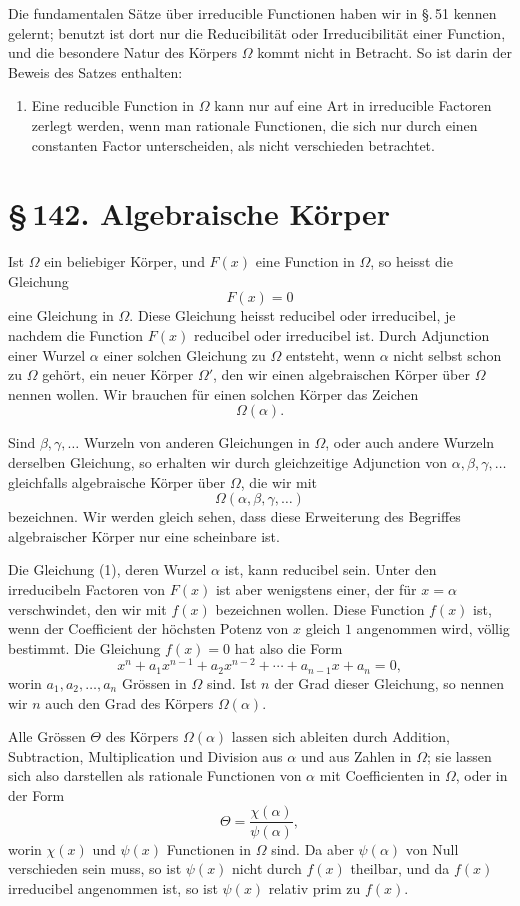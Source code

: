 \documentclass[11pt]{article}
\providecommand{\sect}[2]{\section*{\S\,#1. #2}}
\begin{document}
Die fundamentalen Sätze über irreducible Functionen haben wir in §.\,51 kennen gelernt; benutzt ist dort nur die Reducibilität oder Irreducibilität einer Function, und die besondere Natur des Körpers $\Omega$ kommt nicht in Betracht. So ist darin der Beweis des Satzes enthalten:

\begin{enumerate}[label=\Roman*.,leftmargin=2.8em,start=4]
\item Eine reducible Function in $\Omega$ kann nur auf eine Art in irreducible Factoren zerlegt werden, wenn man rationale Functionen, die sich nur durch einen constanten Factor unterscheiden, als nicht verschieden betrachtet.
\end{enumerate}

\sect{142}{Algebraische Körper}

Ist $\Omega$ ein beliebiger Körper, und $F(x)$ eine Function in $\Omega$, so heisst die Gleichung
\[
\tag{1}
        F(x)=0
\]
eine Gleichung in $\Omega$. Diese Gleichung heisst reducibel oder irreducibel, je nachdem die Function $F(x)$ reducibel oder irreducibel ist. Durch Adjunction einer Wurzel $\alpha$ einer solchen Gleichung zu $\Omega$ entsteht, wenn $\alpha$ nicht selbst schon zu $\Omega$ gehört, ein neuer Körper $\Omega'$, den wir einen algebraischen Körper über $\Omega$ nennen wollen. Wir brauchen für einen solchen Körper das Zeichen
\[
        \Omega(\alpha).
\]

Sind $\beta,\gamma,\ldots$ Wurzeln von anderen Gleichungen in $\Omega$, oder auch andere Wurzeln derselben Gleichung, so erhalten wir durch gleichzeitige Adjunction von $\alpha,\beta,\gamma,\ldots$ gleichfalls algebraische Körper über $\Omega$, die wir mit
\[
        \Omega(\alpha,\beta,\gamma,\ldots)
\]
bezeichnen. Wir werden gleich sehen, dass diese Erweiterung des Begriffes algebraischer Körper nur eine scheinbare ist.

Die Gleichung (1), deren Wurzel $\alpha$ ist, kann reducibel sein. Unter den irreducibeln Factoren von $F(x)$ ist aber wenigstens einer, der für $x=\alpha$ verschwindet, den wir mit $f(x)$ bezeichnen wollen. Diese Function $f(x)$ ist, wenn der Coefficient der höchsten Potenz von $x$ gleich $1$ angenommen wird, völlig bestimmt. Die Gleichung $f(x)=0$ hat also die Form
\[
\tag{2}
        x^n+a_1x^{n-1}+a_2x^{n-2}+\cdots+a_{n-1}x+a_n=0,
\]
worin $a_1,a_2,\ldots,a_n$ Grössen in $\Omega$ sind. Ist $n$ der Grad dieser Gleichung, so nennen wir $n$ auch den Grad des Körpers $\Omega(\alpha)$.

Alle Grössen $\Theta$ des Körpers $\Omega(\alpha)$ lassen sich ableiten durch Addition, Subtraction, Multiplication und Division aus $\alpha$ und aus Zahlen in $\Omega$; sie lassen sich also darstellen als rationale Functionen von $\alpha$ mit Coefficienten in $\Omega$, oder in der Form
\[
\tag{3}
        \Theta=\frac{\chi(\alpha)}{\psi(\alpha)},
\]
worin $\chi(x)$ und $\psi(x)$ Functionen in $\Omega$ sind. Da aber $\psi(\alpha)$ von Null verschieden sein muss, so ist $\psi(x)$ nicht durch $f(x)$ theilbar, und da $f(x)$ irreducibel angenommen ist, so ist $\psi(x)$ relativ prim zu $f(x)$.
\end{document}
